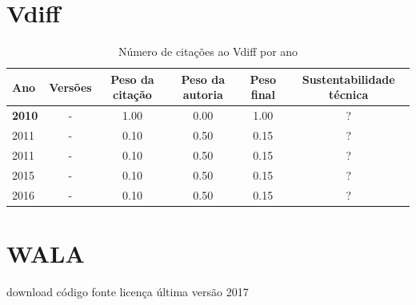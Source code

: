 \section{Vdiff}



\begin{table}[H]
\caption{Número de citações ao Vdiff por ano}
\centering
\begin{tabular}{| l | c | c | c | c | c |}
  \hline
  Ano & Versões & Peso da citação & Peso da autoria & Peso final & Sustentabilidade técnica \\
  \hline
            {\bf 2010}
          &
          -
          &
          1.00
          &
          0.00
          &
            {\color{blue} 1.00}
          &
          ?
          \\
\hline
            2011
          &
          -
          &
          0.10
          &
          0.50
          &
            {\color{red} 0.15}
          &
          ?
          \\
            2011
          &
          -
          &
          0.10
          &
          0.50
          &
            {\color{red} 0.15}
          &
          ?
          \\
\hline
            2015
          &
          -
          &
          0.10
          &
          0.50
          &
            {\color{red} 0.15}
          &
          ?
          \\
\hline
            2016
          &
          -
          &
          0.10
          &
          0.50
          &
            {\color{red} 0.15}
          &
          ?
          \\
\hline
\end{tabular}
\end{table}



\section{WALA}
\checkmark download
\checkmark código fonte
\checkmark licença
\checkmark última versão 2017



